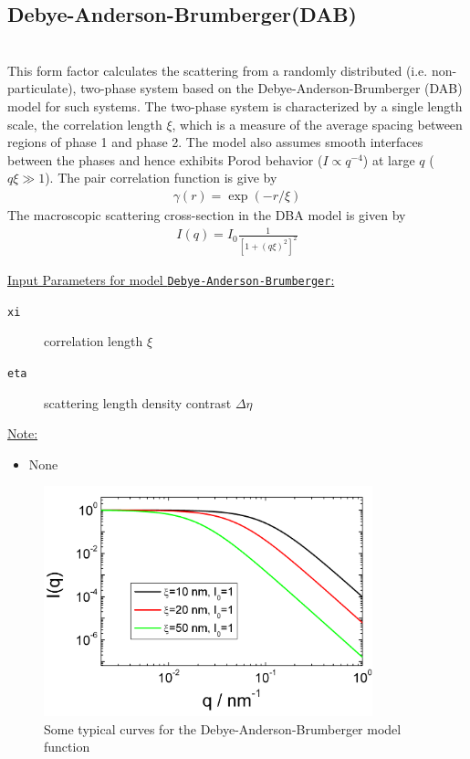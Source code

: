 
\clearpage
\subsection{Debye-Anderson-Brumberger(DAB)}
\label{sect:DAB}~\\

This form factor calculates the scattering from a randomly
distributed (i.e. non-particulate), two-phase system based on the
Debye-Anderson-Brumberger (DAB) \cite{DAB1957,DebyeBueche1949} model
for such systems. The two-phase system is characterized by a single
length scale, the correlation length $\xi$, which is a measure of
the average spacing between regions of phase 1 and phase 2. The
model also assumes smooth interfaces between the phases and hence
exhibits Porod behavior ($I \propto q^{-4}$) at large $q$ ($q \xi
\gg 1$). The pair correlation function is give by
\cite{DebyeBueche1949}
\begin{align}
\gamma(r) = \exp(-r/\xi)
\end{align}
The macroscopic scattering cross-section in the DBA model is given
by
\begin{align}
I(q) = I_0 \frac{1}{\left[1+(q\xi)^2\right]^2}
\end{align}


\underline{Input Parameters for model \texttt{Debye-Anderson-Brumberger}:}\\
\begin{description}
\item[\texttt{xi}] correlation length $\xi$
\item[\texttt{eta}] scattering length density contrast $\Delta\eta$
\end{description}

\underline{Note:}
\begin{itemize}
\item None
\end{itemize}


\begin{figure}[htb]
\begin{center}
\includegraphics[width=0.85\textwidth]{DAB.png}
\end{center}
\caption{Some typical curves for the Debye-Anderson-Brumberger model function} \label{fig:DABIq}
\end{figure}


